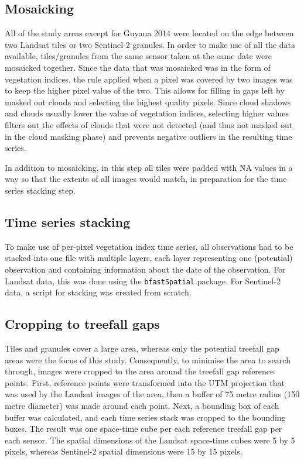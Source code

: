 \documentclass[a4paper,12pt]{scrbook}
\begin{document}
\subsection{Mosaicking}

All of the study areas except for Guyana 2014 were located on the edge between two Landsat tiles or two Sentinel-2 granules. In order to make use of all the data available, tiles/granules from the same sensor taken at the same date were mosaicked together. Since the data that was mosaicked was in the form of vegetation indices, the rule applied when a pixel was covered by two images was to keep the higher pixel value of the two. This allows for filling in gaps left by masked out clouds and selecting the highest quality pixels. Since cloud shadows and clouds usually lower the value of vegetation indices, selecting higher values filters out the effects of clouds that were not detected (and thus not masked out in the cloud masking phase) and prevents negative outliers in the resulting time series.

In addition to mosaicking, in this step all tiles were padded with \ac{NA} values in a way so that the extents of all images would match, in preparation for the time series stacking step.

\subsection{Time series stacking}

To make use of per-pixel vegetation index time series, all observations had to be stacked into one file with multiple layers, each layer representing one (potential) observation and containing information about the date of the observation. For Landsat data, this was done using the \texttt{bfastSpatial} package. For Sentinel-2 data, a script for stacking was created from scratch.

\subsection{Cropping to treefall gaps}

Tiles and granules cover a large area, whereas only the potential treefall gap areas were the focus of this study. Consequently, to minimise the area to search through, images were cropped to the area around the treefall gap reference points. First, reference points were transformed into the \ac{UTM} projection that was used by the Landsat images of the area, then a buffer of 75 metre radius (150 metre diameter) was made around each point. Next, a bounding box of each buffer was calculated, and each time series stack was cropped to the bounding boxes. The result was one space-time cube per each reference treefall gap per each sensor. The spatial dimensions of the Landsat space-time cubes were 5 by 5 pixels, whereas Sentinel-2 spatial dimensions were 15 by 15 pixels.
\end{document}
